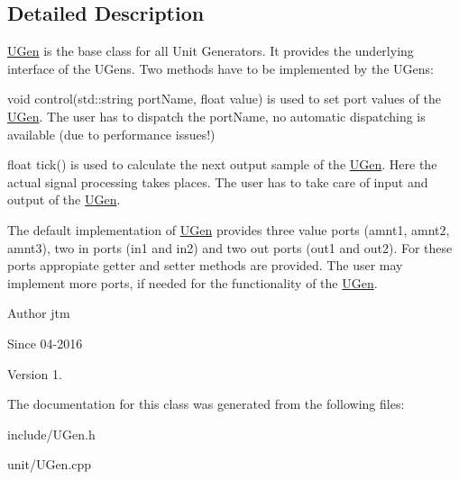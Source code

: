 \subsection{Detailed Description}
\hyperlink{classunit_1_1UGen}{U\-Gen} is the base class for all Unit Generators. It provides the underlying interface of the U\-Gens. Two methods have to be implemented by the U\-Gens\-:


\begin{DoxyItemize}
\item void control(std\-::string port\-Name, float value) is used to set port values of the \hyperlink{classunit_1_1UGen}{U\-Gen}. The user has to dispatch the port\-Name, no automatic dispatching is available (due to performance issues!)
\item float tick() is used to calculate the next output sample of the \hyperlink{classunit_1_1UGen}{U\-Gen}. Here the actual signal processing takes places. The user has to take care of input and output of the \hyperlink{classunit_1_1UGen}{U\-Gen}.
\end{DoxyItemize}

The default implementation of \hyperlink{classunit_1_1UGen}{U\-Gen} provides three value ports (amnt1, amnt2, amnt3), two in ports (in1 and in2) and two out ports (out1 and out2). For these ports appropiate getter and setter methods are provided. The user may implement more ports, if needed for the functionality of the \hyperlink{classunit_1_1UGen}{U\-Gen}.

\begin{DoxyAuthor}{Author}
jtm 
\end{DoxyAuthor}
\begin{DoxySince}{Since}
04-\/2016 
\end{DoxySince}
\begin{DoxyVersion}{Version}
1. 
\end{DoxyVersion}


The documentation for this class was generated from the following files\-:\begin{DoxyCompactItemize}
\item 
include/U\-Gen.\-h\item 
unit/U\-Gen.\-cpp\end{DoxyCompactItemize}
